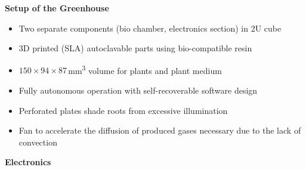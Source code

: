 \documentclass[english,final,20pt,leqno,print]{beamer}
\begin{document}
\begin{frame}[t]
\begin{columns}[T]
\begin{column}{.49\textwidth}
\begin{block}{\strut{}\textbf{Setup of the Greenhouse}}
    \begin{itemize}
        \item Two separate components (bio chamber, electronics section) in 2U cube
        \item 3D printed (SLA) autoclavable parts using bio-compatible resin
        \item $\num{150}\times\num{94}\times\num{87}$\,\unit{\cubic\mm} volume for plants and plant medium
        \item Fully autonomous operation with self-recoverable software design
        \item Perforated plates shade roots from excessive illumination
        \item Fan to accelerate the diffusion of produced gases necessary due to the lack of convection
    \end{itemize}
    \end{block}

    
    \begin{block}{\strut{}\textbf{Electronics}}
    \vspace{-.15em}
    \begin{figure}
        \vspace{-.15em}
        \centering
\end{figure}
\end{block}
\end{column}
\end{columns}
\end{frame}
\end{document}
